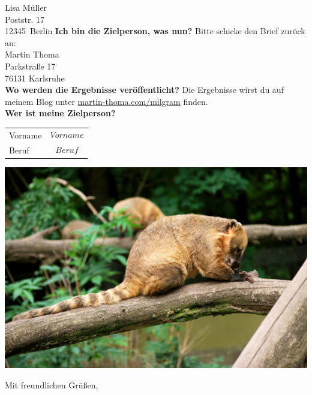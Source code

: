 \documentclass[a4paper, 12pt, KOMAold, sections]{scrlttr2}
\newcommand{\Empfaenger}{Lisa Müller} %
\newcommand{\EStrasse}{Poststr. 17}   %
\newcommand{\EPLZ}{12345}             %
\newcommand{\EOrt}{Berlin}            %
\newcommand{\section}[1]{\noindent\textbf{#1}\newline}
\begin{document}
\begin{letter}{\Empfaenger \\ \EStrasse \\ \EPLZ~\EOrt}
    \section{Ich bin die Zielperson, was nun?}
    Bitte schicke den Brief zurück an:\\

    \noindent Martin Thoma\\
    Parkstraße 17\\
    76131 Karlsruhe\\

    \section{Wo werden die Ergebnisse veröffentlicht?}
    Die Ergebnisse wirst du auf meinem Blog unter \href{http://martin-thoma.com/milgram}{martin-thoma.com/milgram}
    finden.\\

    \section{Wer ist meine Zielperson?}
    \begin{tabular}{ll}
    Vorname & $$Vorname$$\\
    Beruf   & $$Beruf$$\\
    \end{tabular}


    {\centering
    \includegraphics*[width=\linewidth]{YourImage.jpg} 
    }
 
    \closing{Mit freundlichen Grüßen,}
    \end{letter}
\end{document}
